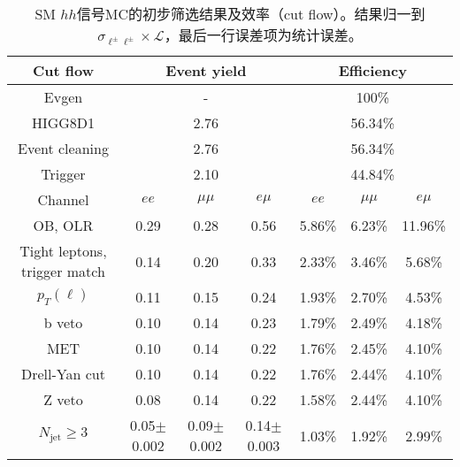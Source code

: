 \begin{table}
\centering\small
\begin{tabular}{c|ccc|ccc}
\hline
\hline
Cut flow &\multicolumn{3}{c|}{Event yield}&\multicolumn{3}{c}{Efficiency}      \\
\hline
Evgen&\multicolumn{3}{c|}{-}&\multicolumn{3}{c}{100\%}\\
HIGG8D1&\multicolumn{3}{c|}{2.76}&\multicolumn{3}{c}{56.34\%}\\
Event cleaning&\multicolumn{3}{c|}{2.76}&\multicolumn{3}{c}{56.34\%}\\
Trigger&\multicolumn{3}{c|}{2.10    }&\multicolumn{3}{c}{44.84\%}\\
Channel&$ee$&$\mu\mu$&$e\mu$&$ee$&$\mu\mu$&$e\mu$\\
\hline
OB, OLR    &0.29    &0.28    &0.56& 5.86\%    &6.23\%    &11.96\%\\
Tight leptons, trigger match    &0.14    &0.20    &0.33    &2.33\%    &3.46\%    &5.68\%\\
$p_T(\ell)$    &0.11    &0.15    &0.24    &1.93\%    &2.70\%    &4.53\%\\
b veto    &0.10    &0.14    &0.23    &1.79\%    &2.49\%    &4.18\%\\
MET    &0.10    &0.14    &0.22    &1.76\%    &2.45\%    &4.10\%\\
Drell-Yan cut    &0.10    &0.14    &0.22    &1.76\%    &2.44\%    &4.10\%\\
Z veto    &0.08    &0.14    &0.22    &1.58\%    &2.44\%    &4.10\%\\
$N_{\text{jet}}\geq3$    &0.05$\pm$0.002    &0.09$\pm$0.002    &0.14$\pm$0.003    &1.03\%    &1.92\%    &2.99\%\\
\hline
\hline
\end{tabular}
\caption{SM $hh$信号MC的初步筛选结果及效率（cut flow）。结果归一到$\sigma_{\ell^{\pm}\ell^{\pm}}\times \mathcal{L}$，最后一行误差项为统计误差。}
\label{tab:presel_cutflow_smhh}
\end{table}
